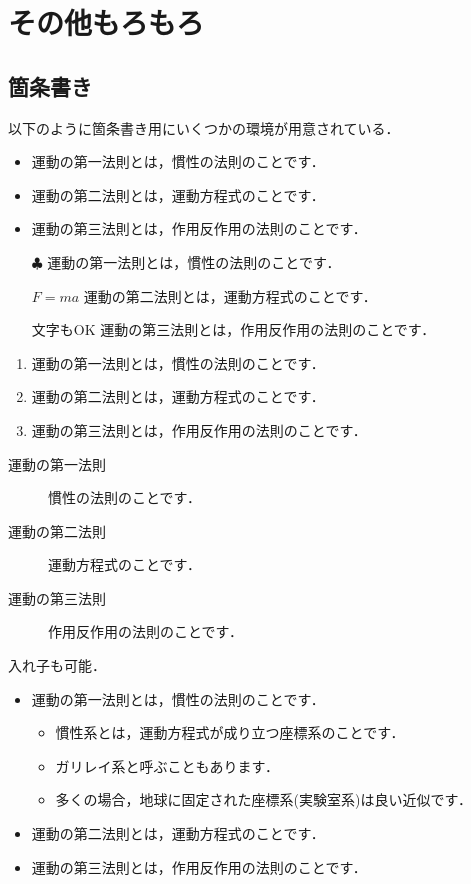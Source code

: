 \section{その他もろもろ}
\subsection{箇条書き}
以下のように箇条書き用にいくつかの環境が用意されている．
\begin{itemize}
 \item 運動の第一法則とは，慣性の法則のことです．
 \item 運動の第二法則とは，運動方程式のことです．
 \item 運動の第三法則とは，作用反作用の法則のことです．
\end{itemize}

\begin{itemize}
 \item[$\clubsuit$] 運動の第一法則とは，慣性の法則のことです．
 \item[$F=ma$] 運動の第二法則とは，運動方程式のことです．
 \item[文字もOK] 運動の第三法則とは，作用反作用の法則のことです．
\end{itemize}

\begin{enumerate}
 \item 運動の第一法則とは，慣性の法則のことです．
 \item 運動の第二法則とは，運動方程式のことです．
 \item 運動の第三法則とは，作用反作用の法則のことです．
\end{enumerate}

\begin{description}
 \item[運動の第一法則]慣性の法則のことです．
 \item[運動の第二法則]運動方程式のことです．
 \item[運動の第三法則]作用反作用の法則のことです．
\end{description}

入れ子も可能．
\begin{itemize}
 \item 運動の第一法則とは，慣性の法則のことです．
    \begin{itemize}
      \item 慣性系とは，運動方程式が成り立つ座標系のことです．
      \item ガリレイ系と呼ぶこともあります．
      \item 多くの場合，地球に固定された座標系(実験室系)は良い近似です．
     \end{itemize}
 \item 運動の第二法則とは，運動方程式のことです．
 \item 運動の第三法則とは，作用反作用の法則のことです．
\end{itemize}

